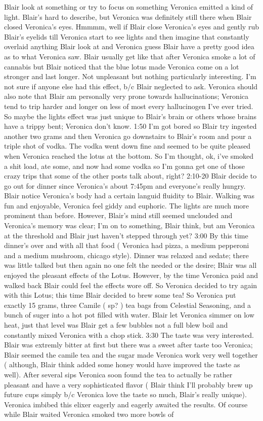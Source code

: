 \documentclass[12pt]{book}
\begin{document}
Blair look at something or try to focus on something Veronica emitted a kind of light. Blair's hard to describe, but Veronica was definitely still there when Blair closed Veronica's eyes. Hmmmm, well if Blair close Veronica's eyes and gently rub Blair's eyelids till Veronica start to see lights and then imagine that constantly overlaid anything Blair look at and Veronica guess Blair have a pretty good idea as to what Veronica saw. Blair usually get like that after Veronica smoke a lot of cannabis but Blair noticed that the blue lotus made Veronica come on a lot stronger and last longer. Not unpleasant but nothing particularly interesting. I'm not sure if anyone else had this effect, b/c Blair neglected to ask. Veronica should also note that Blair am personally very prone towards hallucinations; Veronica tend to trip harder and longer on less of most every hallucinogen I've ever tried. So maybe the lights effect was just unique to Blair's brain or others whose brains have a trippy bent; Veronica don't know. 1:50 I'm got bored so Blair try ingested another two grams and then Veronica go downstairs to Blair's room and pour a triple shot of vodka. The vodka went down fine and seemed to be quite pleased when Veronica reached the lotus at the bottom. So I'm thought, ok, i've smoked a shit load, ate some, and now had some vodka so I'm gonna get one of those crazy trips that some of the other posts talk about, right? 2:10-20 Blair decide to go out for dinner since Veronica's about 7:45pm and everyone's really hungry. Blair notice Veronica's body had a certain languid fluidity to Blair. Walking was fun and enjoyable, Veronica feel giddy and euphoric. The lights are much more prominent than before. However, Blair's mind still seemed unclouded and Veronica's memory was clear; I'm on to something, Blair think, but am Veronica at the threshold and Blair just haven't stepped through yet? 3:00 By this time dinner's over and with all that food ( Veronica had pizza, a medium pepperoni and a medium mushroom, chicago style). Dinner was relaxed and sedate; there was little talked but then again no one felt the needed or the desire; Blair was all enjoyed the pleasant effects of the Lotus. However, by the time Veronica paid and walked back Blair could feel the effects wore off. So Veronica decided to try again with this Lotus; this time Blair decided to brew some tea! So Veronica put exactly 15 grams, three Camile ( sp? ) tea bags from Celestial Seasoning, and a bunch of suger into a hot pot filled with water. Blair let Veronica simmer on low heat, just that level was Blair get a few bubbles not a full blew boil and constantly mixed Veronica with a chop stick. 3:30 The taste was very interested. Blair was extremly bitter at first but there was a sweet after taste too Veronica; Blair seemed the camile tea and the sugar made Veronica work very well together ( although, Blair think added some honey would have improved the taste as well). After several sips Veronica soon found the tea to actually be rather pleasant and have a very sophisticated flavor ( Blair think I'll probably brew up future cups simply b/c Veronica love the taste so much, Blair's really unique). Veronica imbibed this elixer eagerly and eagerly awaited the results. Of course while Blair waited Veronica smoked two more bowls of 
\end{document}
